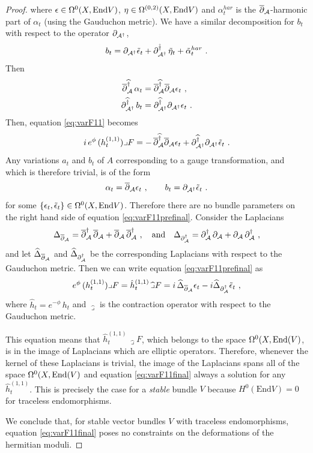 \documentclass[12pt,a4paper]{article}
\def\bar#1{\overline{#1}}
\let\p=\partial
\def\End{\textrm{End}}
\def\bp{\bar{\partial}}
\theoremstyle{definition}
\begin{document}
\begin{proof}
where $\epsilon\in \Omega^0(X, {\rm End} V)$, $\eta\in \Omega^{(0,2)}(X, {\rm End} V)$ and $\alpha_t^{har}$ is the $\bp_{\cal A}$-harmonic part of $\alpha_t$ (using the Gauduchon metric).  We have a similar decomposition for $b_t$ with respect to the operator $\p_{{\cal A}^\dagger}$,
\[ b_t = \p_{{\cal A}^\dagger}\tilde\epsilon_t + \p_{{\cal A}^\dagger}^{\hat\dagger}\, \tilde\eta_t + \tilde\alpha_t^{har}~.\]
Then
\begin{align*}
\bp_{\cal A}^{\widehat\dagger}\, \alpha_t  &=\bp_{\cal A}^{\widehat\dagger}\bp_{\cal A}\epsilon_t~,\\
\p_{{\cal A}^\dagger}^{\widehat\dagger} \,b_t &=  \p_{{\cal A}^\dagger}^{\widehat\dagger}\p_{{\cal A}^\dagger}\epsilon_t~.
\end{align*}
Then, equation \eqref{eq:varF11} becomes
\begin{equation}
i\, e^{\phi}\, (h_t^{(1,1)})\lrcorner F = 
-\, \bp_{\cal A}^{\widehat\dagger}\bp_{\cal A}\epsilon_t
+ \p_{{\cal A}^\dagger}^{\widehat\dagger}\p_{{\cal A}^\dagger}\tilde\epsilon_t
~.\label{eq:varF11prefinal}
\end{equation}
Any variations $a_t$  and $b_t$ of $A$ corresponding to a gauge transformation, and which is therefore trivial,
is of the form
\[ \alpha_t = \bp_{\cal A}\epsilon_t~,\qquad b_t = \p_{{\cal A}^\dagger}\tilde\epsilon_t~.\]
for some $\{\epsilon_t,\tilde\epsilon_t\}\in\Omega^0(X, {\rm End} V)$.  Therefore there are no bundle parameters on the right hand side of equation \eqref{eq:varF11prefinal}.  
Consider the Laplacians 
\[\Delta_{\bp_{\cal A}} = \bp_{\cal A}^\dagger\, \bp_{\cal A}
+ \bp_{\cal A}\, \bp_{\cal A}^\dagger~,\quad{\rm and}\quad
\Delta_{\p_{{\cal A}}^\dagger} = \p_{\cal A}^\dagger\, \p_{\cal A}
+ \p_{\cal A}\, \p_{\cal A}^\dagger~,\]
and let $\widehat\Delta_{\bp_{\cal A}}$ and $\widehat\Delta_{\p_{{\cal A}}^\dagger}$ be the corresponding Laplacians with respect to the Gauduchon metric.
Then we can write equation \eqref{eq:varF11prefinal} as
\begin{equation}
e^{\phi}\, (h_t^{(1,1)})\lrcorner F = \hat h_t^{(1,1)}\,\widehat\lrcorner F = 
i\, \widehat\Delta_{\bp_{\cal A}}\epsilon_t -i\widehat\Delta_{\p_{{\cal A}}^\dagger}\tilde\epsilon_t~,
\label{eq:varF11final}
\end{equation}
where $\hat h_t = e^{-\phi}\, h_t$ and $\widehat\lrcorner$ is the contraction operator with respect to the Gauduchon metric.

This equation means that $\hat h_t^{(1,1)}\,\widehat\lrcorner F$, which belongs to the space $ \Omega^0(X, {\rm End}(V)$, is in the image of Laplacians which are elliptic operators.  Therefore, whenever the kernel of these Laplacians is trivial, the image of the Laplacians spans all of the space $ \Omega^0(X, {\rm End}(V)$ and equation \eqref{eq:varF11final} always a solution for any  $\hat h_t^{(1,1)}$.  This is precisely the case for a {\it stable} bundle $V$ because $H^0(\End V) = 0$ for traceless endomorphisms.

We conclude that, for stable vector bundles $V$ with traceless endomorphisms, equation \eqref{eq:varF11final} poses no constraints on the deformations of the hermitian moduli. 

\end{proof}
\end{document}
